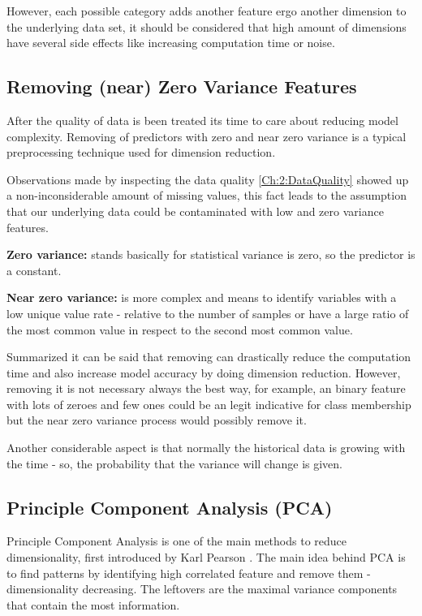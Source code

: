 However, each possible category adds another feature ergo another dimension to the underlying data set, it should be considered that high amount of dimensions have several side effects like increasing computation time or noise.

\subsection{Removing (near) Zero Variance Features}\label{Ch:2:RNZVF}
After the quality of data is been treated its time to care about reducing model complexity. Removing of predictors with zero and near zero variance is a typical preprocessing technique used for dimension reduction. 

Observations made by inspecting the data quality \ref{Ch:2:DataQuality} showed up  a non-inconsiderable amount of missing values, this fact leads to the assumption that our underlying data could be contaminated with low and zero variance features.

\textbf{Zero variance:} stands basically for statistical variance is zero, so the predictor is a constant.

\textbf{Near zero variance:} is more complex and means to identify  variables with a low unique value rate - relative to the number of samples or have a large ratio of the most common value in respect to the second most common value.

Summarized it can be said that removing can drastically reduce the computation time and also increase model accuracy by doing dimension reduction. However, removing it is not necessary always the best way, for example, an binary feature with lots of zeroes and few ones could be an legit indicative for class membership but the near zero variance process would possibly remove it.

Another considerable aspect is that normally the historical data is growing with the time - so, the probability that the variance will change is given.

\subsection{Principle Component Analysis (PCA)}\label{Ch:2:PCA} 
Principle Component Analysis is one of the main methods to reduce dimensionality, first introduced by Karl Pearson \cite{Pearson:1901}. The main idea behind PCA is to find patterns by identifying high correlated feature and remove them - dimensionality decreasing. The leftovers are the maximal variance components that contain the most information.  


